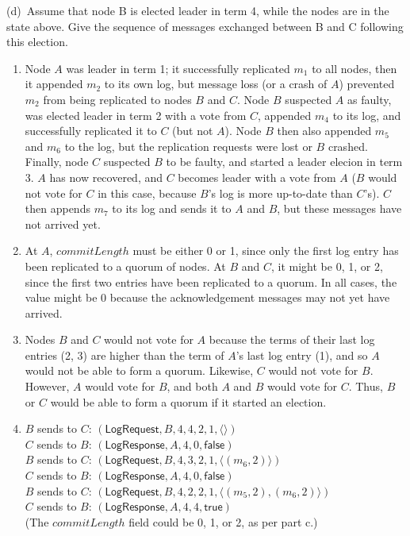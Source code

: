 {    \noindent (d)~Assume that node B is elected leader in term 4, while the nodes are in the state above.
    Give the sequence of messages exchanged between B and C following this election.
}{
    \begin{enumerate} \renewcommand{\theenumi}{\alph{enumi}} %
        \item Node $A$ was leader in term 1; it successfully replicated $m_1$ to all nodes, then it appended $m_2$ to its own log, but message loss (or a crash of $A$) prevented $m_2$ from being replicated to nodes $B$ and $C$.
            Node $B$ suspected $A$ as faulty, was elected leader in term 2 with a vote from $C$, appended $m_4$ to its log, and successfully replicated it to $C$ (but not $A$).
            Node $B$ then also appended $m_5$ and $m_6$ to the log, but the replication requests were lost or $B$ crashed.
            Finally, node $C$ suspected $B$ to be faulty, and started a leader elecion in term 3.
            $A$ has now recovered, and $C$ becomes leader with a vote from $A$ ($B$ would not vote for $C$ in this case, because $B$'s log is more up-to-date than $C$'s).
            $C$ then appends $m_7$ to its log and sends it to $A$ and $B$, but these messages have not arrived yet.
        \item At $A$, $\mathit{commitLength}$ must be either 0 or 1, since only the first log entry has been replicated to a quorum of nodes.
            At $B$ and $C$, it might be 0, 1, or 2, since the first two entries have been replicated to a quorum.
            In all cases, the value might be 0 because the acknowledgement messages may not yet have arrived.
        \item Nodes $B$ and $C$ would not vote for $A$ because the terms of their last log entries (2, 3) are higher than the term of $A$'s last log entry (1), and so $A$ would not be able to form a quorum.
            Likewise, $C$ would not vote for $B$.
            However, $A$ would vote for $B$, and both $A$ and $B$ would vote for $C$.
            Thus, $B$ or $C$ would be able to form a quorum if it started an election.
        \item $B$ sends to $C$: $(\mathsf{LogRequest}, B, 4, 4, 2, 1, \langle\rangle)$ \\
            $C$ sends to $B$: $(\mathsf{LogResponse}, A, 4, 0, \mathsf{false})$ \\
            $B$ sends to $C$: $(\mathsf{LogRequest}, B, 4, 3, 2, 1, \langle(m_6, 2)\rangle)$ \\
            $C$ sends to $B$: $(\mathsf{LogResponse}, A, 4, 0, \mathsf{false})$ \\
            $B$ sends to $C$: $(\mathsf{LogRequest}, B, 4, 2, 2, 1, \langle(m_5, 2), (m_6, 2)\rangle)$ \\
            $C$ sends to $B$: $(\mathsf{LogResponse}, A, 4, 4, \mathsf{true})$ \\
            (The $\mathit{commitLength}$ field could be 0, 1, or 2, as per part c.)
    \end{enumerate}
}

